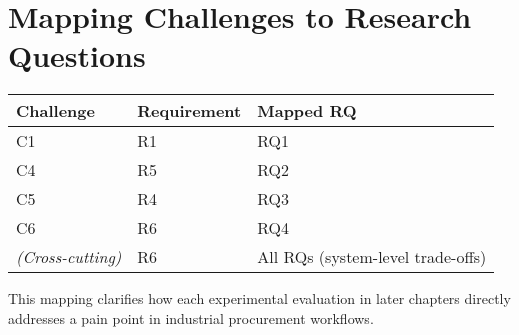 \section{Mapping Challenges to Research Questions}
\begin{center}
\begin{tabular}{lll}
\textbf{Challenge} & \textbf{Requirement} & \textbf{Mapped RQ} \\\hline
C1 & R1 & RQ1  \\
C4 & R5 & RQ2  \\
C5 & R4 & RQ3  \\
C6 & R6 & RQ4  \\
\textit{(Cross-cutting)} & R6 & All RQs (system-level trade-offs) \\
\end{tabular}
\end{center}


This mapping clarifies how each experimental evaluation in later chapters directly addresses a pain point in industrial procurement workflows.
